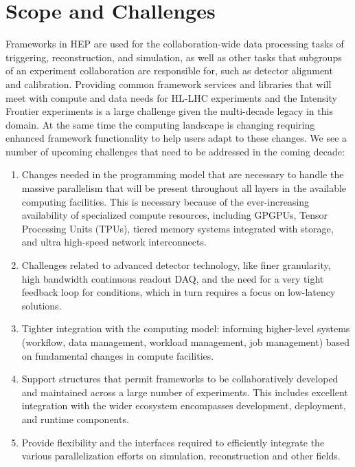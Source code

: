 \documentclass[12pt,a4paper]{article}
\begin{document}
\section{Scope and Challenges}
\label{sec:scope-challenges}

Frameworks in HEP are used for the collaboration-wide data processing
tasks of triggering, reconstruction, and simulation, as well as other tasks that
subgroups of an experiment collaboration are responsible for, such as
detector alignment and calibration.
Providing common framework services and libraries that will meet with
compute and data needs for HL-LHC experiments and the Intensity Frontier
experiments is a large challenge given the multi-decade legacy in this
domain. At the same time the computing landscape is changing requiring
enhanced framework functionality to help users adapt to these changes.
We see a number of upcoming challenges that need to be addressed in the
coming decade:

\begin{enumerate}
\item
    Changes needed in the programming model that are necessary to
    handle the massive parallelism that will be present throughout all
    layers in the available computing facilities. This is necessary
    because of the ever-increasing availability of specialized compute
    resources, including GPGPUs, Tensor Processing Units (TPUs),
    tiered memory systems integrated with storage, and ultra
    high-speed network interconnects.
\item
    Challenges related to advanced detector technology, like finer
    granularity, high bandwidth continuous readout DAQ, and the need
    for a very tight feedback loop for conditions, which in turn
    requires a focus on low-latency solutions.
\item
    Tighter integration with the computing model: informing
    higher-level systems (workflow, data management, workload
    management, job management) based on fundamental changes in
    compute facilities.
\item
    Support structures that permit frameworks to be collaboratively
    developed and maintained across a large number of
    experiments. This includes excellent integration with the wider
    ecosystem encompasses development, deployment, and runtime
    components.
\item
    Provide flexibility and the interfaces required to efficiently
    integrate the various parallelization efforts on simulation,
    reconstruction and other fields.
\end{enumerate}
\end{document}
